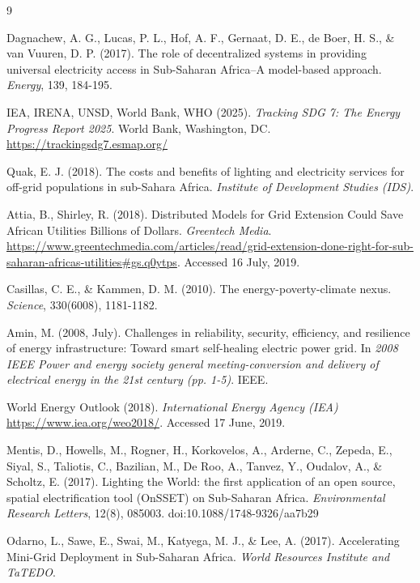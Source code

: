 \documentclass[final,3p,times]{elsarticle}
\begin{document}
\begin{thebibliography}{9}

Dagnachew, A. G., Lucas, P. L., Hof, A. F., Gernaat, D. E., de Boer, H. S., \& van Vuuren, D. P. (2017). The role of decentralized systems in providing universal electricity access in Sub-Saharan Africa–A model-based approach. \textit{Energy}, 139, 184-195.

IEA, IRENA, UNSD, World Bank, WHO (2025). \textit{Tracking SDG 7: The Energy Progress Report 2025}. World Bank, Washington, DC. \url{https://trackingsdg7.esmap.org/}

Quak, E. J. (2018). The costs and benefits of lighting and electricity services for off-grid populations in sub-Sahara Africa. \textit{Institute of Development Studies (IDS)}.

Attia, B., Shirley, R. (2018). Distributed Models for Grid Extension Could Save African Utilities Billions of Dollars. \textit{Greentech Media}. \url{https://www.greentechmedia.com/articles/read/grid-extension-done-right-for-sub-saharan-africas-utilities#gs.q0ytps}. Accessed 16 July, 2019.

Casillas, C. E., \& Kammen, D. M. (2010). The energy-poverty-climate nexus. \textit{Science}, 330(6008), 1181-1182.

Amin, M. (2008, July). Challenges in reliability, security, efficiency, and resilience of energy infrastructure: Toward smart self-healing electric power grid. In \textit{2008 IEEE Power and energy society general meeting-conversion and delivery of electrical energy in the 21st century (pp. 1-5)}. IEEE.

World Energy Outlook (2018). \textit{International Energy Agency (IEA)}
\url{https://www.iea.org/weo2018/}. Accessed 17 June, 2019.

Mentis, D., Howells, M., Rogner, H., Korkovelos, A., Arderne, C., Zepeda, E., Siyal, S., Taliotis, C., Bazilian, M., De Roo, A., Tanvez, Y., Oudalov, A., \& Scholtz, E. (2017). Lighting the World: the first application of an open source, spatial electrification tool (OnSSET) on Sub-Saharan Africa. \textit{Environmental Research Letters}, 12(8), 085003. doi:10.1088/1748-9326/aa7b29

Odarno, L., Sawe, E., Swai, M., Katyega, M. J., \& Lee, A. (2017). Accelerating Mini-Grid Deployment in Sub-Saharan Africa. \textit{World Resources Institute and TaTEDO}.


\end{thebibliography}
\end{document}
